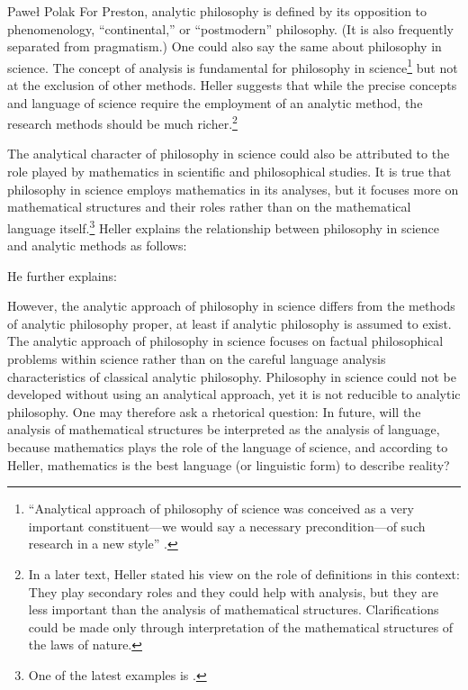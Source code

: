 \begin{artengenv}{Paweł Polak}
For Preston, analytic philosophy is defined by its opposition to phenomenology, ``continental,'' or ``postmodern''
philosophy. (It is also frequently separated from pragmatism.) One could also say the same about philosophy in science.
The concept of analysis is fundamental for philosophy in science\footnote{``Analytical approach of philosophy of science
was conceived as a very important constituent—we would say a necessary precondition—of such research in a new style''
\parencite[p.8]{pol_heller_introduction_1983}.
} but not at the exclusion of other methods. Heller suggests that while the
precise concepts and language of science require the employment of an analytic method, the research methods should be
much richer.\footnote{In a later text, Heller stated his view on the role of definitions in this context: They play
secondary roles and they could help with analysis, but they are less important than the analysis of mathematical
structures. Clarifications could be made only through interpretation of the mathematical structures of the laws of
nature.}

The analytical character of philosophy in science could also be attributed to the role played by mathematics in
scientific and philosophical studies. It is true that philosophy in science employs mathematics in its analyses, but it
focuses more on mathematical structures and their roles rather than on the mathematical language itself.\footnote{One
of the latest examples is
\parencite{pol_heller_category_2016}.
} Heller explains the relationship between
philosophy in science and analytic methods as follows:

He further explains:



However, the analytic approach of philosophy in science differs from the methods of analytic philosophy proper, at least
if analytic philosophy is assumed to exist. The analytic approach of philosophy in science focuses on factual
philosophical problems within science rather than on the careful language analysis characteristics of classical
analytic philosophy. Philosophy in science could not be developed without using an analytical approach, yet it is not
reducible to analytic philosophy. One may therefore ask a rhetorical question: In future, will the analysis of
mathematical structures be interpreted as the analysis of language, because mathematics plays the role of the language
of science, and according to Heller, mathematics is the best language (or linguistic form) to describe reality?


\end{artengenv}
